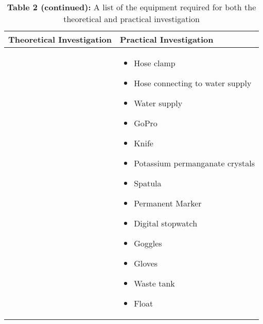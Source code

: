 \begin{table}[H]
	\centering
	\begin{tabularx}{\textwidth}{|X|X|}
		\hline
		\textbf{Theoretical Investigation} & \textbf{Practical Investigation} \\
		\hline
		&
		\begin{itemize}[leftmargin=1.5em, itemsep=2pt, topsep=0pt, label=--]
			
			\item Hose clamp
			\item Hose connecting to water supply
			\item Water supply
			\item GoPro
			\item Knife
			\item Potassium permanganate crystals
			\item Spatula
			\item Permanent Marker
			\item Digital stopwatch
			\item Goggles
			\item Gloves
			\item Waste tank
			\item Float
		\end{itemize} \\
		\hline
	\end{tabularx}
	\caption*{\textbf{Table 2 (continued):} A list of the equipment required for both the theoretical and practical investigation}
	\label{tab:equipmentList2}
\end{table}
